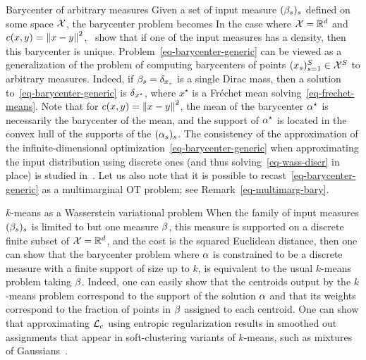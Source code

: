\begin{rem2}{Barycenter of arbitrary measures}\label{rem-bary-carlier}
	Given a set of input measure $(\beta_s)_s$ defined on some space $\mathcal{X}$, the barycenter problem becomes 
	In the case where $\mathcal{X}=\mathbb{R}^d$ and $c(x,y)=\left\| x-y \right\|^2$,~\citet{Carlier_wasserstein_barycenter} show that if one of the input measures has a density, then this barycenter is unique. 
	Problem~\eqref{eq-barycenter-generic} can be viewed as a generalization of the problem of computing barycenters of points $(x_s)_{s=1}^S \in \mathcal{X}^S$ to arbitrary measures. Indeed, if $\beta_s=\delta_{x_s}$ is a single Dirac mass, then a solution to~\eqref{eq-barycenter-generic} is $\delta_{x^\star}$, where $x^\star$ is a Fr\'echet mean solving~\eqref{eq-frechet-means}.
	Note that for $c(x,y)=\left\| x-y \right\|^2$, the mean of the barycenter $\alpha^\star$ is necessarily the barycenter of the mean, \ie 
	and the support of $\alpha^\star$ is located in the convex hull of the supports of the $(\alpha_s)_s$.
	The consistency of the approximation of the infinite-dimensional optimization~\eqref{eq-barycenter-generic} when approximating the input distribution using discrete ones (and thus solving~\eqref{eq-wass-discr} in place) is studied in~\citet{Carlier-NumericsBarycenters}.
	Let us also note that it is possible to recast~\eqref{eq-barycenter-generic} as a multimarginal OT problem; see Remark~\ref{eq-multimarg-bary}. 
\end{rem2}

\begin{rem2}{$k$-means as a Wasserstein variational problem}\label{rem-bary-kmeans}
When the family of input measures $(\beta_s)_s$ is limited to but one measure $\beta$, this measure is supported on a discrete finite subset of $\mathcal{X}=\mathbb{R}^{d}$, and the cost is the squared Euclidean distance, then one can show that the barycenter problem 
where $\alpha$ is constrained to be a discrete measure with a finite support of size up to $k$, is equivalent to the usual $k$-means problem taking $\beta$. Indeed, one can easily show that the centroids output by the $k$-means problem correspond to the support of the solution $\alpha$ and that its weights correspond to the fraction of points in $\beta$ assigned to each centroid. One can show that approximating $\mathcal{L}_{c}$ using entropic regularization results in smoothed out assignments that appear in soft-clustering variants of $k$-means, such as mixtures of Gaussians~\citep{dessein2017parameter}.
\end{rem2}

